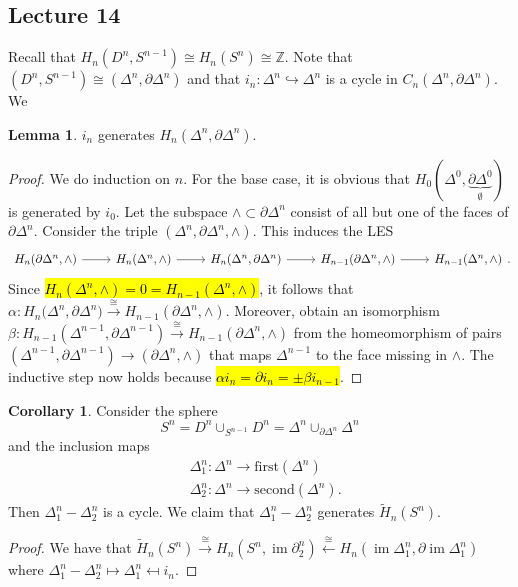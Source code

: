 \documentclass[10pt,letterpaper,cm]{nupset}
\theoremstyle{definition}
\theoremstyle{theorem}
\newtheorem{lemma}[definition]{Lemma}
\newtheorem{corollary}[definition]{Corollary}
\theoremstyle{remark}
\newcommand{\Z}{\mathbb Z}
\newcommand{\1}{\mathbb{1}}
\newcommand{\0}{\vec 0}
\DeclareMathOperator{\im}{im}
\begin{document}
\subsection{Lecture 14}

Recall that $H_n(D^n, S^{n-1}) \cong H_n(S^n) \cong \Z$. Note that $(D^n, S^{n-1}) \cong (\Delta^n, \partial{\Delta^n})$ and that $i_n : \Delta^n \hookrightarrow \Delta^n$ is a cycle in $C_n(\Delta^n, \partial{\Delta^n})$. We

\begin{lemma}
$i_n$ generates $H_n(\Delta^n, \partial{\Delta^n})$.
\end{lemma}
\begin{proof}
We do induction on $n$. For the base case, it is obvious that $H_0(\Delta^0, \underbrace{\partial{\Delta^0}}_{\emptyset})$ is generated by $i_0$. Let the subspace $\wedge \subset \partial{\Delta^n}$ consist of all but one of the faces of $\partial{\Delta^n}$. Consider the triple $(\Delta^n, \partial{\Delta^n}, \wedge)$. This induces the LES
\[
\begin{tikzcd}
{H_n(\partial{\Delta^n, \wedge})} \arrow[r] & {H_n(\Delta^n, \wedge)} \arrow[r] & {H_n(\Delta^n, \partial{\Delta^n)}} \arrow[r] & {H_{n-1}(\partial{\Delta^n}, \wedge)} \arrow[r] & {H_{n-1}(\Delta^n, \wedge)}
\end{tikzcd}
.\] Since \hl{$H_n(\Delta^n, \wedge) =0 = H_{n-1}(\Delta^n, \wedge)$}, it follows that $\alpha: H_n(\Delta^n, \partial{\Delta^n)} \overset{\cong}{\longrightarrow}  H_{n-1}(\partial{\Delta^n}, \wedge)$. Moreover, obtain an isomorphism $\beta: H_{n-1}(\Delta^{n-1}, \partial{\Delta^{n-1}}) \overset{\cong}{\longrightarrow} H_{n-1}(\partial{\Delta^n}, \wedge)$ from the homeomorphism of pairs $(\Delta^{n-1}, \partial{\Delta^{n-1}}) \to (\partial{\Delta^n}, \wedge)$ that maps $\Delta^{n-1}$ to the face missing in $\wedge$. The inductive step now holds because \hl{$\alpha{i_n} = \partial{i_n}= \pm \beta{i_{n-1}}$}.
\end{proof}

\begin{corollary}
Consider the sphere $$S^n = D^n \cup_{S^{n-1}} D^n= \Delta^n \cup_{\partial{\Delta^n}}\Delta^n$$ and the inclusion maps 
\begin{align*}
& \Delta^n_1 :\Delta^n \to \text{first}(\Delta^n)
\\ &  \Delta^n_2 :\Delta^n \to \text{second}(\Delta^n).
\end{align*} Then $\Delta^n_1 - \Delta^n_2$ is a cycle. We claim that $\Delta_1^n -\Delta_2^n$ generates $\widetilde{H}_n(S^n)$.
\end{corollary}
\begin{proof}
We have that $\widetilde{H}_n(S^n) \overset{\cong}{\longrightarrow} H_n(S^n, \im{\partial_2^n}) \overset{\cong}{\longleftarrow} H_n(\im{\Delta^n_1}, \partial{\im{\Delta_1^n}})$ where $\Delta_1^n -\Delta_2^n \mapsto \Delta^n_1 \mapsfrom i_n$.
\end{proof}
\end{document}
